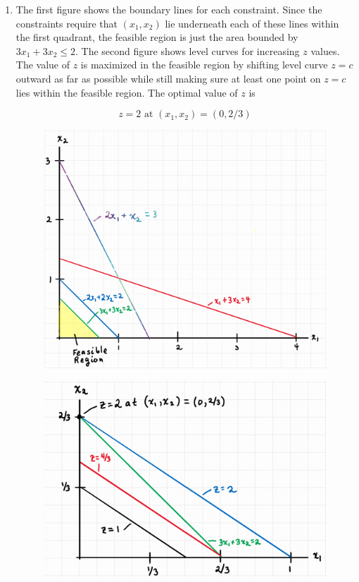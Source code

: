 \documentclass{article}
\begin{document}
\begin{enumerate}
\newpage
\item  The first figure shows the boundary lines for each constraint. Since the constraints require that $(x_1,x_2)$ lie underneath each of these lines within the first quadrant, the feasible region is just the area bounded by $3x_1 + 3x_2 \leq 2$. The second figure shows level curves for increasing $z$ values. The value of $z$ is maximized in the feasible region by shifting level curve $z = c$ outward as far as possible while still making sure at least one point on $z=c$ lies within the feasible region. The optimal value of $z$ is 

$$
\boxed{z= 2 \text{ at } (x_1,x_2) = (0,2/3)}
$$ 

\begin{figure}[H]
\centering
  \includegraphics[width=0.65\linewidth]{Capture 1.png}
\end{figure}

\begin{figure}[H]
\centering
  \includegraphics[width=0.65\linewidth]{Capture 2.png}
\end{figure}

\end{enumerate}
\end{document}
